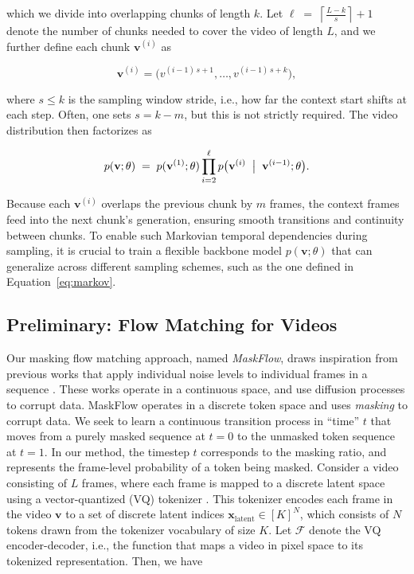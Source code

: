 which we divide into overlapping chunks of length $k$. Let $\ell\;=\;\left\lceil \frac{L - k}{s} \right\rceil + 1$ denote the number of chunks needed to cover the video of length $L$, and we further define each chunk $\mathbf{v}^{(i)}$ as

\begin{equation}
   \mathbf{v}^{(i)} = \bigl(v^{(i-1)\,s + 1}, \dots, v^{(i-1)\,s + k}\bigr),
\end{equation}

where $s \le k$ is the sampling window stride, i.e., how far the context start shifts at each step. Often, one sets $s = k - m$, but this is not strictly required. The video distribution then factorizes as

\begin{equation}
\label{eq:markov}
   p(\mathbf{v};{\theta})
   \;=\;
   p(\mathbf{v}^{(1)};\theta)
   \prod_{i=2}^{\ell}
      p
         \bigl(
            \mathbf{v}^{(i)} 
            \;\bigm|\;
            \mathbf{v}^{(i-1)};\theta
         \bigr).
\end{equation}

Because each $\mathbf{v}^{(i)}$ overlaps the previous chunk by $m$ frames, the context frames feed into the next chunk's generation, ensuring smooth transitions and continuity between chunks. To enable such Markovian temporal dependencies during sampling, it is crucial to train a flexible backbone model \(p(\mathbf{v};\theta)\) that can generalize across different sampling schemes, such as the one defined in Equation~\eqref{eq:markov}.


\subsection{Preliminary: Flow Matching for Videos}
\label{subsec:flow}

Our masking flow matching approach, named \emph{MaskFlow}, draws inspiration from previous works that apply individual noise levels to individual frames in a sequence \cite{chen2024diffusionforcing, ruhe2024rollingdiffusionmodels}. These works operate in a continuous space, and use diffusion processes to corrupt data. MaskFlow operates in a discrete token space and uses \emph{masking} to corrupt data. We seek to learn a continuous transition process in ``time'' \(t\) that moves from a purely masked sequence at \(t=0\) to the unmasked token sequence at \(t=1\). In our method, the timestep $t$ corresponds to the masking ratio, and represents the frame-level probability of a token being masked. Consider a video consisting of \(L\) frames, where each frame is mapped to a discrete latent space using a vector-quantized (VQ) tokenizer \cite{esser2021taming_vqgan}. This tokenizer encodes each frame in the video $\mathbf{v}$ to a set of discrete latent indices $\mathbf{x}_{\text{latent}} \in [K]^N$, which consists of $N$ tokens drawn from the tokenizer vocabulary of size $K$. Let \(\mathcal{F}\) denote the VQ encoder-decoder, i.e., the function that maps a video in pixel space to its tokenized representation. Then, we have

